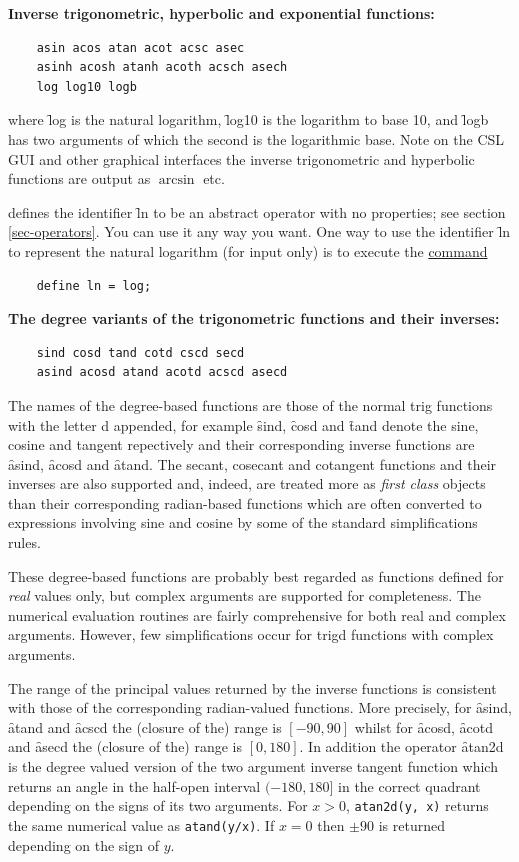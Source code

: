 \textbf{Inverse trigonometric, hyperbolic and exponential functions:}
\begin{verbatim}
    asin acos atan acot acsc asec
    asinh acosh atanh acoth acsch asech
    log log10 logb
\end{verbatim}
where \f{log} is the natural logarithm, \f{log10} is the logarithm to
base 10, and \f{logb} has two arguments of which the second is the
logarithmic base.
Note on the CSL GUI and other graphical interfaces the inverse
trigonometric and hyperbolic functions are output as $\arcsin$ etc.

\REDUCE defines the identifier \f{ln} to be an abstract operator with
no properties; see section \ref{sec-operators}. You can use it any way
you want. One way to use the identifier \f{ln} to represent the
natural logarithm (for input only) is to execute the
\hyperlink{command:DEFINE}{command}
\begin{verbatim}
    define ln = log;
\end{verbatim}

\textbf{The degree variants of the trigonometric functions and their inverses:}
\begin{verbatim}
    sind cosd tand cotd cscd secd
    asind acosd atand acotd acscd asecd
\end{verbatim}
The names of the degree-based functions are those of the normal trig
functions with the letter d appended, for example \f{sind}, \f{cosd}
and \f{tand} denote the sine, cosine and tangent repectively and their
corresponding inverse functions are \f{asind}, \f{acosd} and
\f{atand}. The secant, cosecant and cotangent functions and their
inverses are also supported and, indeed, are treated more as
\textit{first class} objects than their corresponding radian-based
functions which are often converted to expressions involving sine and
cosine by some of the standard {\REDUCE} simplifications rules.

These degree-based functions are probably best regarded as functions
defined for \emph{real} values only, but complex arguments are
supported for completeness. The numerical evaluation routines are
fairly comprehensive for both real and complex arguments. However, few
simplifications occur for trigd functions with complex arguments.

The range of the principal values returned by the inverse functions is
consistent with those of the corresponding radian-valued functions.
More precisely, for \f{asind}, \f{atand} and \f{acscd} the (closure of
the) range is $[-90, 90]$ whilst for \f{acosd}, \f{acotd} and
\f{asecd} the (closure of the) range is $[0, 180]$. In addition the
operator \f{atan2d} is the degree valued version of the two argument
inverse tangent function which returns an angle in the half-open
interval $(-180, 180]$ in the correct quadrant depending on the signs
of its two arguments. For $x>0$, \texttt{atan2d(y, x)} returns the
same numerical value as \texttt{atand(y/x)}. If $x=0$ then $\pm 90$ is
returned depending on the sign of $y$.

